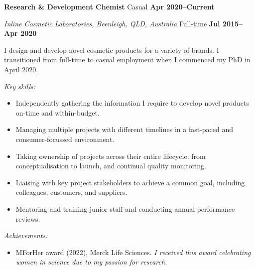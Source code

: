 
\textbf{\large Research \& Development Chemist} \hfill Casual \textbf{Apr 2020--Current}\par
\textit{Inline Cosmetic Laboratories, Beenleigh, QLD, Australia} \hfill Full-time \textbf{Jul 2015--Apr 2020}\par
I design and develop novel cosmetic products for a variety of brands. I transitioned from full-time to casual employment when I commenced my PhD in April 2020.\par
\vspace{1mm}
\textit{Key skills:} \par
\begin{itemize}
	\item Independently gathering the information I require to develop novel products on-time and within-budget.
	\item Managing multiple projects with different timelines in a fast-paced and consumer-focussed environment.
	\item Taking ownership of projects across their entire lifecycle: from conceptualisation to launch, and continual quality monitoring.
	\item Liaising with key project stakeholders to achieve a common goal, including colleagues, customers, and suppliers.
    \item Mentoring and training junior staff and conducting annual performance reviews.
\end{itemize}\par
\vspace{1mm}
\textit{Achievements:} \par
\begin{itemize}
	\item MForHer award (2022), Merck Life Sciences. \textit{I received this award celebrating women in science due to my passion for research.}
\end{itemize}\par